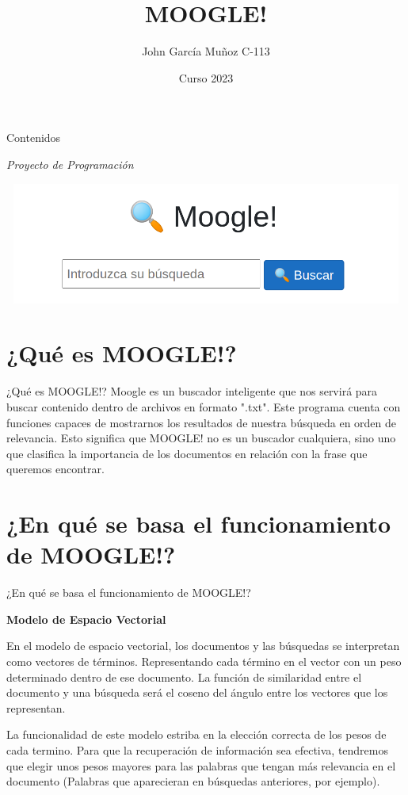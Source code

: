 \documentclass[aspectratio = 169]{beamer}
\title{\Huge MOOGLE!}
\author{John García Muñoz C-113}
\institute{Universidad de La Habana\\Facultad de Matemática y Computación}
\date{Curso 2023}
\begin{document}
\maketitle
\begin{frame}{Contenidos}
\tableofcontents
\end{frame}
\begin{center}
\vfill
\vspace{2cm}
{\itshape\LARGE Proyecto de Programación \par}
\includegraphics[width=14cm, height=4cm]{moogle.png}
\end{center}

\section{¿Qué es MOOGLE!?}
\begin{frame}{¿Qué es MOOGLE!?}
\justifying
Moogle es un buscador inteligente que nos servirá para buscar contenido dentro de archivos en formato ".txt". Este programa cuenta con funciones capaces de mostrarnos los resultados de nuestra búsqueda en orden de relevancia. Esto significa que MOOGLE! no es un buscador cualquiera, sino uno que clasifica la importancia de los documentos en relación con la frase que queremos encontrar.
\end{frame}
\section{¿En qué se basa el funcionamiento de MOOGLE!?}
\begin{frame}{¿En qué se basa el funcionamiento de MOOGLE!?}
\justifying
\begin{center}\textbf{Modelo de Espacio Vectorial}\end{center}
En el modelo de espacio vectorial, los documentos y las búsquedas se interpretan como vectores de términos. Representando cada término en el vector con un peso determinado dentro de ese documento. La función de similaridad entre el documento y una búsqueda será el coseno del ángulo entre los vectores que los representan.

La funcionalidad de este modelo estriba en la elección correcta de los pesos de cada termino. Para que la recuperación de información sea efectiva, tendremos que elegir unos pesos mayores para las palabras que tengan más relevancia en el documento (Palabras que aparecieran en búsquedas anteriores, por ejemplo).
\end{frame}
\end{document}
